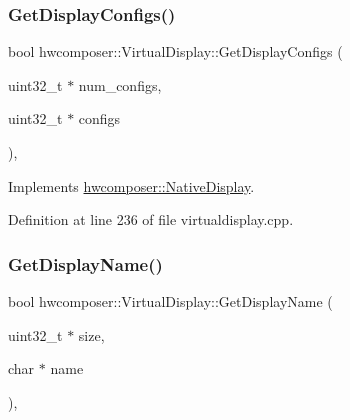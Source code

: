 \subsubsection{\texorpdfstring{Get\+Display\+Configs()}{GetDisplayConfigs()}}
{\footnotesize\ttfamily bool hwcomposer\+::\+Virtual\+Display\+::\+Get\+Display\+Configs (\begin{DoxyParamCaption}\item[{uint32\+\_\+t $\ast$}]{num\+\_\+configs,  }\item[{uint32\+\_\+t $\ast$}]{configs }\end{DoxyParamCaption})\hspace{0.3cm}{\ttfamily [override]}, {\ttfamily [virtual]}}



Implements \mbox{\hyperlink{classhwcomposer_1_1NativeDisplay_a9479dcf82765996db6d7ea1cdcef3864}{hwcomposer\+::\+Native\+Display}}.



Definition at line 236 of file virtualdisplay.\+cpp.


\begin{DoxyCode}{0}
\end{DoxyCode}
\mbox{\label{classhwcomposer_1_1VirtualDisplay_a3f83c9978807be3b71c095f12d22359c}} 
\subsubsection{\texorpdfstring{Get\+Display\+Name()}{GetDisplayName()}}
{\footnotesize\ttfamily bool hwcomposer\+::\+Virtual\+Display\+::\+Get\+Display\+Name (\begin{DoxyParamCaption}\item[{uint32\+\_\+t $\ast$}]{size,  }\item[{char $\ast$}]{name }\end{DoxyParamCaption})\hspace{0.3cm}{\ttfamily [override]}, {\ttfamily [virtual]}}



